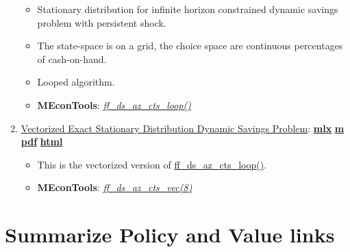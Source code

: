 \documentclass[
]{book}
\providecommand{\tightlist}{%
  \setlength{\itemsep}{0pt}\setlength{\parskip}{0pt}}
\begin{document}
\begin{enumerate}
  \begin{itemize}
  \tightlist
  \item
    Stationary distribution for infinite horizon constrained dynamic savings problem with persistent shock.
  \item
    The state-space is on a grid, the choice space are continuous percentages of cash-on-hand.
  \item
    Looped algorithm.
  \item
    \textbf{MEconTools}: \emph{\href{https://github.com/FanWangEcon/MEconTools/blob/master/MEconTools/ds/ff_ds_az_cts_loop.m}{ff\_ds\_az\_cts\_loop()}}
  \end{itemize}
\item
  \href{https://fanwangecon.github.io/MEconTools/MEconTools/doc/ds/htmlpdfm/fx_ds_az_cts_vec.html}{Vectorized Exact Stationary Distribution Dynamic Savings Problem}: \href{https://github.com/FanWangEcon/MEconTools/blob/master/MEconTools/doc/ds/fx_ds_az_cts_vec.mlx}{\textbf{mlx}} \textbar{} \href{https://github.com/FanWangEcon/MEconTools/blob/master/MEconTools/doc/ds/htmlpdfm/fx_ds_az_cts_vec.m}{\textbf{m}} \textbar{} \href{https://github.com/FanWangEcon/MEconTools/blob/master/MEconTools/doc/ds/htmlpdfm/fx_ds_az_cts_vec.pdf}{\textbf{pdf}} \textbar{} \href{https://fanwangecon.github.io/MEconTools/MEconTools/doc/ds/htmlpdfm/fx_ds_az_cts_vec.html}{\textbf{html}}

  \begin{itemize}
  \tightlist
  \item
    This is the vectorized version of \href{https://github.com/FanWangEcon/MEconTools/blob/master/MEconTools/ds/ff_ds_az_cts_loop.m}{ff\_ds\_az\_cts\_loop()}.
  \item
    \textbf{MEconTools}: \emph{\href{https://github.com/FanWangEcon/MEconTools/blob/master/MEconTools/ds/ff_ds_az_cts_vec.m}{ff\_ds\_az\_cts\_vec(8)}}
  \end{itemize}
\end{enumerate}

\hypertarget{summarize-policy-and-value-links}{%
\section{Summarize Policy and Value links}\label{summarize-policy-and-value-links}}
\end{document}
